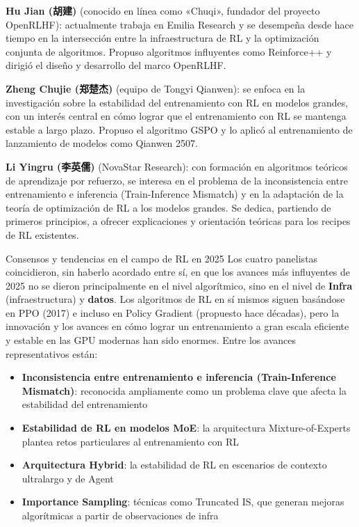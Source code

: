 \textbf{Hu Jian (胡建)} (conocido en línea como «Chuqi», fundador del proyecto OpenRLHF): actualmente trabaja en Emilia Research y se desempeña desde hace tiempo en la intersección entre la infraestructura de RL y la optimización conjunta de algoritmos. Propuso algoritmos influyentes como Reinforce++ y dirigió el diseño y desarrollo del marco OpenRLHF.

\textbf{Zheng Chujie (郑楚杰)} (equipo de Tongyi Qianwen): se enfoca en la investigación sobre la estabilidad del entrenamiento con RL en modelos grandes, con un interés central en cómo lograr que el entrenamiento con RL se mantenga estable a largo plazo. Propuso el algoritmo GSPO y lo aplicó al entrenamiento de lanzamiento de modelos como Qianwen 2507.

\textbf{Li Yingru (李英儒)} (NovaStar Research): con formación en algoritmos teóricos de aprendizaje por refuerzo, se interesa en el problema de la inconsistencia entre entrenamiento e inferencia (Train-Inference Mismatch) y en la adaptación de la teoría de optimización de RL a los modelos grandes. Se dedica, partiendo de primeros principios, a ofrecer explicaciones y orientación teóricas para los recipes de RL existentes.

\begin{knowledgebox}{Consensos y tendencias en el campo de RL en 2025}
Los cuatro panelistas coincidieron, sin haberlo acordado entre sí, en que los avances más influyentes de 2025 no se dieron principalmente en el nivel algorítmico, sino en el nivel de \textbf{Infra} (infraestructura) y \textbf{datos}. Los algoritmos de RL en sí mismos siguen basándose en PPO (2017) e incluso en Policy Gradient (propuesto hace décadas), pero la innovación y los avances en cómo lograr un entrenamiento a gran escala eficiente y estable en las GPU modernas han sido enormes. Entre los avances representativos están:
\begin{itemize}
    \item \textbf{Inconsistencia entre entrenamiento e inferencia (Train-Inference Mismatch)}: reconocida ampliamente como un problema clave que afecta la estabilidad del entrenamiento
    \item \textbf{Estabilidad de RL en modelos MoE}: la arquitectura Mixture-of-Experts plantea retos particulares al entrenamiento con RL
    \item \textbf{Arquitectura Hybrid}: la estabilidad de RL en escenarios de contexto ultralargo y de Agent
    \item \textbf{Importance Sampling}: técnicas como Truncated IS, que generan mejoras algorítmicas a partir de observaciones de infra
\end{itemize}
\end{knowledgebox}

